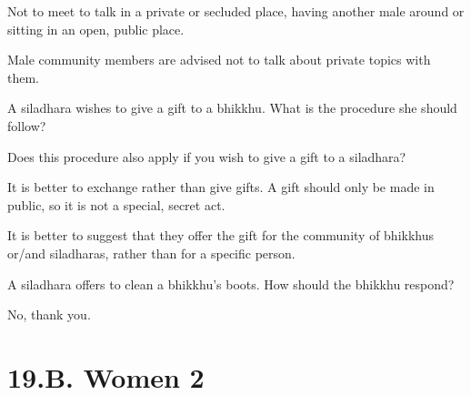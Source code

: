 \begin{solution}
  Not to meet to talk in a private or secluded place,
  having another male around or sitting in an open, public place.

  Male community members are advised not to talk about private topics with them.
\end{solution}

\bigskip

A siladhara wishes to give a gift to a bhikkhu. What is the procedure she should follow?

\bigskip

Does this procedure also apply if you wish to give a gift to a siladhara?

\begin{solution}
  It is better to exchange rather than give gifts.
  A gift should only be made in public, so it is not a special, secret act.

  It is better to suggest that they offer the gift for the community of bhikkhus or/and siladharas,
  rather than for a specific person.
\end{solution}

\bigskip

A siladhara offers to clean a bhikkhu's boots. How should the bhikkhu respond?

\begin{solution}
  No, thank you.
\end{solution}

\chapter{19.B. Women 2}
\renewcommand*{\theChapterTitle}{19.B. Women 2}
